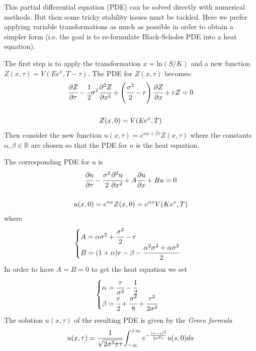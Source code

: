 This partial differential equation (PDE) can be solved directly with numerical methods. But then some tricky stability issues must be tackled. Here we prefer applying variable transformations as much as possible in order to obtain a simpler form (i.e. the goal is to re-formulate Black-Scholes PDE into a heat equation).

The first step is to apply the transformation $x = \textrm{ln}(S/K)$ and a new function $Z(x, \tau) = V (Ee^x, T -\tau)$. 
The PDE for $Z(x, \tau)$ becomes:
\begin{equation}
\begin{gathered}
\cfrac{\partial Z}{\partial \tau}-\cfrac{1}{2}\sigma^2 \cfrac{\partial^2 Z}{\partial x^2}+\left(\cfrac{\sigma^2}{2}-r\right)  \cfrac{\partial Z}{\partial x} + rZ = 0\\ \\
Z(x, 0) =V(Ee^x, T)
\end{gathered}
\end{equation}
Then consider the new function $u(x,\tau)=e^{\alpha x + \beta\tau}Z(x,\tau)$ where the constants $\alpha, \beta \in \mathbb{R}$ are chosen so that the PDE for $u$ is the heat equation.

The corresponding PDE for $u$ is
\begin{equation}
\begin{gathered}
\cfrac{\partial u}{\partial \tau} -\cfrac{\sigma^2}{2} \cfrac{\partial^2 u}{\partial x^2}+A\cfrac{\partial u}{\partial x} + Bu = 0\\ \\
u(x,0)=e^{\alpha x}Z(x,0)=e^{\alpha x}V(Ke^x, T)
\end{gathered}
\end{equation}
where
\begin{equation}
\begin{cases}
A=\alpha\sigma^2 + \cfrac{\sigma^2}{2}-r\\
B=(1+\alpha)r-\beta-\cfrac{\alpha^2\sigma^2+\alpha\sigma^2}{2}
\end{cases}
\end{equation}
In order to have $A=B=0$ to get the heat equation we set
\begin{equation}
\begin{cases}
\alpha=\cfrac{r}{\sigma^2}-\cfrac{1}{2}\\
\beta=\cfrac{r}{2}+\cfrac{\sigma^2}{8}+\cfrac{r^2}{2\sigma^2}
\end{cases}
\end{equation}
The solution $u(x,\tau)$ of the resulting PDE is given by the \emph{Green formula}
\begin{equation}
u(x, \tau)=\cfrac{1}{\sqrt{2\sigma^2\pi\tau}}\int^{+\infty}_{-\infty}e^{-\frac{(x-s)^2}{2\sigma^2\tau}}u(s,0)ds
\end{equation}


